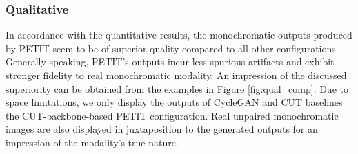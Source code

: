 \subsubsection{Qualitative} \label{subsubsec:qual_res}
In accordance with the quantitative results, the monochromatic outputs produced by PETIT seem to be of superior quality compared to all other configurations.
Generally speaking, PETIT's outputs incur less spurious artifacts and exhibit stronger fidelity to real monochromatic modality. 
An impression of the discussed superiority can be obtained from the examples in Figure \ref{fig:qual_comp}.
Due to space limitations, we only display the outputs of CycleGAN and CUT baselines \vs the CUT-backbone-based PETIT configuration.
Real unpaired monochromatic images are also displayed in juxtaposition to the generated outputs for an impression of the modality's true nature.

